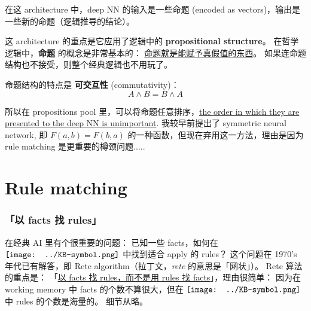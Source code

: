 \documentclass[orivec]{article}
\newcommand{\cc}[2]{#1}
\newcommand{\cc}[2]{#2}
\newcommand*\KB{\vcenter{\hbox{\texttt{[image: ../KB-symbol.png]}}}}
\begin{document}
\cc{
在这 architecture 中，deep NN 的输入是一些命题 (encoded as vectors)，输出是一些新的命题（逻辑推导的结论）。 
}{
In this architecture, the deep NN inputs a set of propositions (encoded as vectors), and outputs some new propositions (the result of logical inference).
}

\cc{
这 architecture 的重点是它应用了逻辑中的 \textbf{propositional structure}。 在哲学逻辑中，\textbf{命题} 的概念是非常基本的： \uline{命题就是能赋予真假值的东西}。  如果连命题结构也不接受，则整个经典逻辑也不用玩了。  }{
The special point of this architecture is that it respects the propositional structure of logic.  In philosophical logic, the notion of the proposition is of central importance.  Basically, \uline{a proposition is an entity that we can assign true or false}.  If we abandon even this notion, there wouldn't be much left of classical logic.
}

\cc{
命题结构的特点是 \textbf{可交互性} (commutativity)：}{
The essential property of propositions is their \textbf{commutativity}:
}
\begin{equation}
A \wedge B = B \wedge A
\end{equation}
\cc{
所以在 propositions pool 里，可以将命题任意排序，\uline{the order in which they are presented to the deep NN is unimportant}.  我较早前提出了 symmetric neural network, 即 $F(a, b) = F(b, a)$ 的一种函数，但现在弃用这一方法，理由是因为 rule matching 是更重要的樽颈问题.....}{
which is why, in the propositions pool, we can arrange the order of propositions arbitrarily, and \uline{the order in which they are presented to the deep NN is unimportant}.  I have previously proposed a kind of \textbf{symmetric NN} of the functional form $F(a, b) = F(b, a)$, but I have abandoned this idea for the reason explained in the next section....
}

\section{Rule matching}

\subsubsection{\cc{「以 facts 找 rules」}{``Finding rules with facts''}}

\cc{
在经典 AI 里有个很重要的问题： 已知一些 facts，如何在 $\KB$ 中找到适合 apply 的 rules？  这个问题在 1970's 年代已有解答，即 Rete algorithm（拉丁文，\textit{rete} 的意思是「网状」）。  Rete 算法的重点是： 「\uline{以 facts 找 rules，而不是用 rules 找 facts}」，理由很简单： 因为在 working memory 中 facts 的个数不算很大，但在 $\KB$ 中 rules 的个数是海量的。 细节从略。}{
In classical logic-based AI there used to be a critical problem:  given some facts, how to find the applicable rules in the $\KB$?  This is solved in the 1970s by the Rete algorithm (\textit{rete} in Latin means something like ``threads'').  The main idea in Rete is:  searching rules by facts, instead of searching facts by rules.  The reason is simple:  the number of facts in working memory is relatively small, but the number of rules in $\KB$ is enormous.
}
\end{document}
